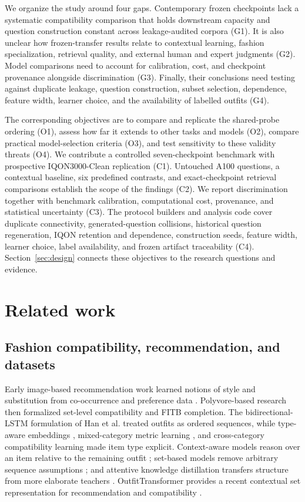 \documentclass[preprint,12pt]{elsarticle}
\begin{document}
We organize the study around four gaps. Contemporary frozen checkpoints lack a systematic compatibility comparison that holds downstream capacity and question construction constant across leakage-audited corpora (G1). It is also unclear how frozen-transfer results relate to contextual learning, fashion specialization, retrieval quality, and external human and expert judgments (G2). Model comparisons need to account for calibration, cost, and checkpoint provenance alongside discrimination (G3). Finally, their conclusions need testing against duplicate leakage, question construction, subset selection, dependence, feature width, learner choice, and the availability of labelled outfits (G4).

The corresponding objectives are to compare and replicate the shared-probe ordering (O1), assess how far it extends to other tasks and models (O2), compare practical model-selection criteria (O3), and test sensitivity to these validity threats (O4). We contribute a controlled seven-checkpoint benchmark with prospective IQON3000-Clean replication (C1). Untouched A100 questions, a contextual baseline, six predefined contrasts, and exact-checkpoint retrieval comparisons establish the scope of the findings (C2). We report discrimination together with benchmark calibration, computational cost, provenance, and statistical uncertainty (C3). The protocol builders and analysis code cover duplicate connectivity, generated-question collisions, historical question regeneration, IQON retention and dependence, construction seeds, feature width, learner choice, label availability, and frozen artifact traceability (C4). Section~\ref{sec:design} connects these objectives to the research questions and evidence.

\section{Related work}\label{sec:related}

\subsection{Fashion compatibility, recommendation, and datasets}

Early image-based recommendation work learned notions of style and substitution from co-occurrence and preference data \cite{mcauley2015styles,veit2015style}. Polyvore-based research then formalized set-level compatibility and FITB completion. The bidirectional-LSTM formulation of Han et al. \cite{han2017bilstm} treated outfits as ordered sequences, while type-aware embeddings \cite{vasileva2018typeaware}, mixed-category metric learning \cite{chen2018dress}, and cross-category compatibility learning \cite{polania2019categories} made item type explicit. Context-aware models reason over an item relative to the remaining outfit \cite{cucurull2019context}; set-based models remove arbitrary sequence assumptions \cite{li2017set}; and attentive knowledge distillation transfers structure from more elaborate teachers \cite{song2018attentive}. OutfitTransformer provides a recent contextual set representation for recommendation and compatibility \cite{sarkar2023outfittransformer}.
\end{document}
